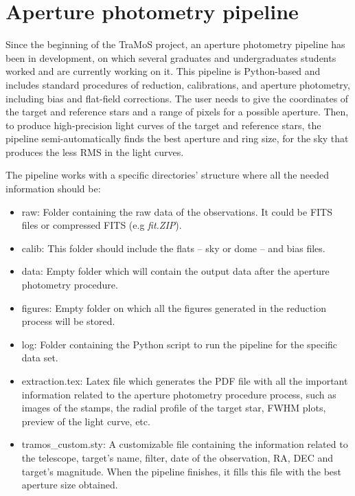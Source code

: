 \chapter{Aperture photometry pipeline}\label{chap:pipeline}

Since the beginning of the TraMoS project, an aperture photometry pipeline has been in development, on which several graduates and undergraduates students worked and are currently working on it. This pipeline is Python-based and includes standard procedures of reduction, calibrations, and aperture photometry, including bias and flat-field corrections. The user needs to give the coordinates of the target and reference stars and a range of pixels for a possible aperture. Then, to produce high-precision light curves of the target and reference stars, the pipeline semi-automatically finds the best aperture and ring size, for the sky that produces the less RMS in the light curves. 

The pipeline works with a specific directories' structure where all the needed information should be:
\begin{itemize}
\item raw: Folder containing the raw data of the observations. It could be FITS files or compressed FITS (e.g \textit{fit.ZIP}).
\item calib: This folder should include the flats -- sky or dome -- and bias files.
\item data: Empty folder which will contain the output data after the aperture photometry procedure.
\item figures: Empty folder on which all the figures generated in the reduction process will be stored.
\item log: Folder containing the Python script to run the pipeline for the specific data set.
\item extraction.tex: Latex file which generates the PDF file with all the important information related to the aperture photometry procedure process, such as images of the stamps, the radial profile of the target star, FWHM plots, preview of the light curve, etc.
\item tramos\_custom.sty: A customizable file containing the information related to the telescope, target's name, filter, date of the observation, RA, DEC and target's magnitude. When the pipeline finishes, it fills this file with the best aperture size obtained.
\end{itemize}

